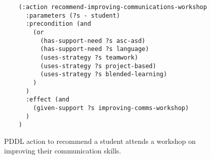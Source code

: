 \begin{figure}[t]
    \begin{lstlisting}
    (:action recommend-improving-communications-workshop
      :parameters (?s - student)
      :precondition (and
        (or
          (has-support-need ?s asc-asd)
          (has-support-need ?s language)
          (uses-strategy ?s teamwork)
          (uses-strategy ?s project-based)
          (uses-strategy ?s blended-learning)
        )
      )
      :effect (and 
        (given-support ?s improving-comms-workshop)
      )
    )
    \end{lstlisting}
    \caption{PDDL action to recommend a student attends a workshop on improving their communication skills.}\label{fig:improve-comms-workshop}
\end{figure}